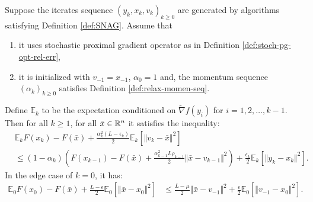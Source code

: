 \documentclass[12pt]{article}
\newcommand{\expect}{\ensuremath{\mathbb E}}
\begin{document}
        \begin{theorem}\label{thm:snag-descent}
            Suppose the iterates sequence $(y_k, x_k, v_k)_{k\ge 0}$ are generated by algorithms satisfying Definition \ref{def:SNAG}. 
            Assume that
            \begin{enumerate}[nosep]
                \item it uses stochastic proximal gradient operator as in Definition \ref{def:stoch-pg-opt-rel-err}, 
                \item it is initialized with $v_{-1} = x_{-1}$, $\alpha_0 = 1$ and, the momentum sequence $(\alpha_k)_{k \ge 0}$ satisfies Definition \ref{def:relax-momen-seq}. 
            \end{enumerate}
            Define $\expect_{k}$ to be the expectation conditioned on $\tilde \nabla f(y_i)$ for $i = 1, 2, \ldots, k - 1$. 
            Then for all $k \ge 1$, for all $\bar x \in \mathbb R^n$ it satisfies the inequality: 
            \begin{align*}
                & \expect_kF(x_k) - F(\bar x) 
                + \frac{\alpha_k^2(L - \epsilon_k)}{2}\expect_k \left[\Vert v_k - \bar x\Vert^2\right]
                \\
                &\le 
                (1 - \alpha_k)\left(
                    F(x_{k - 1}) - F(\bar x)
                    + \frac{\alpha_{k - 1}^2L\rho_{k - 1}}{2}\Vert \bar x - v_{k - 1}\Vert^2
                \right) 
                + \frac{\epsilon_k}{2}\expect_k \left[\Vert y_k - x_k \Vert^2\right].  
            \end{align*}
            In the edge case of $k = 0$, it has: 
            \begin{align*}
                \expect_0 F(x_0) - F(\bar x)  
                + \frac{L - \epsilon}{2}\expect_0\left[\Vert \bar x - x_0\Vert^2\right]
                &\le 
                \frac{L - \mu}{2} \Vert \bar x - v_{-1}\Vert^2
                + \frac{\epsilon}{2}\expect_0\left[\Vert v_{-1} - x_0\Vert^2\right]. 
            \end{align*}
        \end{theorem}
\end{document}
